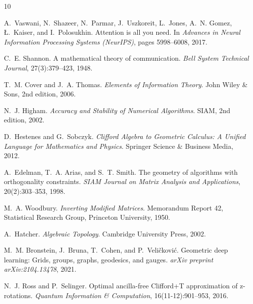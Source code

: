 \documentclass[11pt,twoside,a4paper]{article}
\theoremstyle{plain}
\theoremstyle{definition}
\theoremstyle{remark}
\begin{document}

\begin{thebibliography}{10}

A.~Vaswani, N.~Shazeer, N.~Parmar, J.~Uszkoreit, L.~Jones, A.~N. Gomez, {\L}.~Kaiser, and I.~Polosukhin.
\newblock Attention is all you need.
\newblock In \emph{Advances in Neural Information Processing Systems (NeurIPS)}, pages 5998--6008, 2017.

C.~E. Shannon.
\newblock A mathematical theory of communication.
\newblock \emph{Bell System Technical Journal}, 27(3):379--423, 1948.

T.~M. Cover and J.~A. Thomas.
\newblock \emph{Elements of Information Theory}.
\newblock John Wiley \& Sons, 2nd edition, 2006.

N.~J. Higham.
\newblock \emph{Accuracy and Stability of Numerical Algorithms}.
\newblock SIAM, 2nd edition, 2002.

D.~Hestenes and G.~Sobczyk.
\newblock \emph{Clifford Algebra to Geometric Calculus: A Unified Language for Mathematics and Physics}.
\newblock Springer Science \& Business Media, 2012.

A.~Edelman, T.~A. Arias, and S.~T. Smith.
\newblock The geometry of algorithms with orthogonality constraints.
\newblock \emph{SIAM Journal on Matrix Analysis and Applications}, 20(2):303--353, 1998.

M.~A. Woodbury.
\newblock \emph{Inverting Modified Matrices}.
\newblock Memorandum Report 42, Statistical Research Group, Princeton University, 1950.

A.~Hatcher.
\newblock \emph{Algebraic Topology}.
\newblock Cambridge University Press, 2002.

M.~M. Bronstein, J.~Bruna, T.~Cohen, and P.~Veli{\v{c}}kovi{\'{c}}.
\newblock Geometric deep learning: Grids, groups, graphs, geodesics, and gauges.
\newblock \emph{arXiv preprint arXiv:2104.13478}, 2021.

N.~J. Ross and P.~Selinger.
\newblock Optimal ancilla-free {C}lifford+{T} approximation of z-rotations.
\newblock \emph{Quantum Information \& Computation}, 16(11-12):901--953, 2016.

\end{thebibliography}
\end{document}

